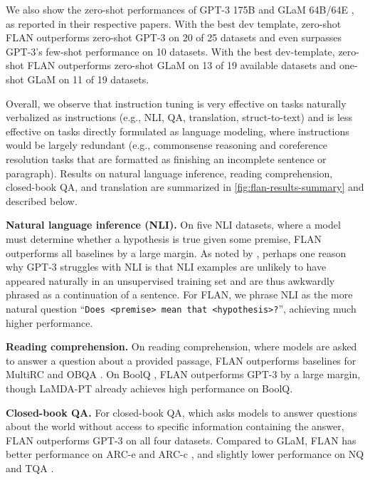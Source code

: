 We also show the zero-shot performances of GPT-3 175B \citep{brown2020language} and GLaM 64B/64E \citep{du2021glam}, as reported in their respective papers. With the best dev template, zero-shot FLAN outperforms zero-shot GPT-3 on 20 of 25 datasets and even surpasses GPT-3's few-shot performance on 10 datasets. With the best dev-template, zero-shot FLAN outperforms zero-shot GLaM on 13 of 19 available datasets and one-shot GLaM on 11 of 19 datasets.

Overall, we observe that instruction tuning is very effective on tasks naturally verbalized as instructions (e.g., NLI, QA, translation, struct-to-text) and is less effective on tasks directly formulated as language modeling, where instructions would be largely redundant (e.g., commonsense reasoning and coreference resolution tasks that are formatted as finishing an incomplete sentence or paragraph). Results on natural language inference, reading comprehension, closed-book QA, and translation are summarized in \ref{fig:flan-results-summary} and described below.

\textbf{Natural language inference (NLI).} On five NLI datasets, where a model must determine whether a hypothesis is true given some premise, FLAN outperforms all baselines by a large margin. As noted by \citet{brown2020language}, perhaps one reason why GPT-3 struggles with NLI is that NLI examples are unlikely to have appeared naturally in an unsupervised training set and are thus awkwardly phrased as a continuation of a sentence. For FLAN, we phrase NLI as the more natural question ``\texttt{\small Does <premise> mean that <hypothesis>?}'', achieving much higher performance.

\textbf{Reading comprehension.} On reading comprehension, where models are asked to answer a question about a provided passage, FLAN outperforms baselines for MultiRC \citep{khashabi-etal-2018-looking} and OBQA \citep{mihaylov-etal-2018-suit}. On BoolQ \citep{clark-etal-2019-boolq}, FLAN outperforms GPT-3 by a large margin, though LaMDA-PT already achieves high performance on BoolQ.

\textbf{Closed-book QA.} For closed-book QA, which asks models to answer questions about the world without access to specific information containing the answer, FLAN outperforms GPT-3 on all four datasets. Compared to GLaM, FLAN has better performance on ARC-e and ARC-c \citep{clark2018think}, and slightly lower performance on NQ \citep{orqa,kwiatkowski2019natural} and TQA \citep{JoshiTriviaQA2017}.

